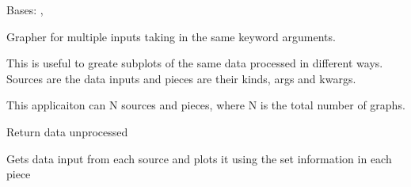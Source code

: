 \documentclass[letterpaper,10pt,english]{sphinxmanual}
\begin{document}
\begin{fulllineitems}
\label{\detokenize{dalio.application:dalio.application.graphers.MultiGrapher}}
Bases: {\hyperref[\detokenize{dalio.application:dalio.application.application.Application}]{}}, 

Grapher for multiple inputs taking in the same keyword arguments.

This is useful to greate subplots of the same data processed in
different ways. Sources are the data inputs and pieces are their kinds,
args and kwargs.

This applicaiton can N sources and pieces, where N is the total number of
graphs.

\begin{fulllineitems}
\label{\detokenize{dalio.application:dalio.application.graphers.MultiGrapher.build_model}}
Return data unprocessed

\end{fulllineitems}


\begin{fulllineitems}
\label{\detokenize{dalio.application:dalio.application.graphers.MultiGrapher.run}}
Gets data input from each source and plots it using the set
information in each piece

\end{fulllineitems}


\end{fulllineitems}

\end{document}

